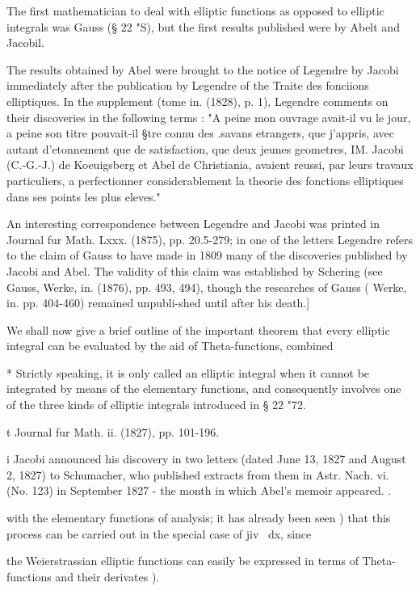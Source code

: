 The first mathematician to deal with elliptic functions as opposed to
elliptic integrals was Gauss (§ 22 "S), but the first results
published were by Abelt and Jacobil.

The results obtained by Abel were brought to the notice of Legendre by
Jacobi immediately after the publication by Legendre of the Traite des
fonciions elliptiques. In the supplement (tome in. (1828), p. 1),
Legendre comments on their discoveries in the following terms : "A
peine mon ouvrage avait-il vu le jour, a peine son titre pouvait-il
§tre connu des .savans etrangers, que j'appris, avec autant
d'etonnement que de satisfaction, que deux jeunes geometres, IM.
Jacobi (C.-G.-J.) de Koeuigsberg et Abel de Christiania, avaient
reussi, par leurs travaux particuliers, a perfectionner
considerablement la theorie des fonctions elliptiques dans ses points
les plus eleves."

An interesting correspondence between Legendre and Jacobi was printed
in Journal fur Math. Lxxx. (1875), pp. 20.5-279; in one of the letters
Legendre refers to the claim of Gauss to have made in 1809 many of the
discoveries published by Jacobi and Abel. The validity of this claim
was established by Schering (see Gauss, Werke, in. (1876), pp. 493,
494), though the researches of Gauss ( Werke, in. pp. 404-460)
remained unpubli-shed until after his death.]

We shall now give a brief outline of the important theorem that every
elliptic integral can be evaluated by the aid of Theta-functions,
combined

* Strictly speaking, it is only called an elliptic integral when it
cannot be integrated by means of the elementary functions, and
consequently involves one of the three kinds of elliptic integrals
introduced in § 22 "72.

t Journal fur Math. ii. (1827), pp. 101-196.

i Jacobi announced his discovery in two letters (dated June 13, 1827
and August 2, 1827) to Schumacher, who published extracts from them in
Astr. Nach. vi. (No. 123) in September 1827 - the month in which
Abel's memoir appeared. .

%
%

with the elementary functions of analysis; it has already been seen
) that this process can be carried out in the special case of
jiv~ dx, since

the Weierstrassian elliptic functions can easily be expressed in terms
of Theta-functions and their derivates ).


